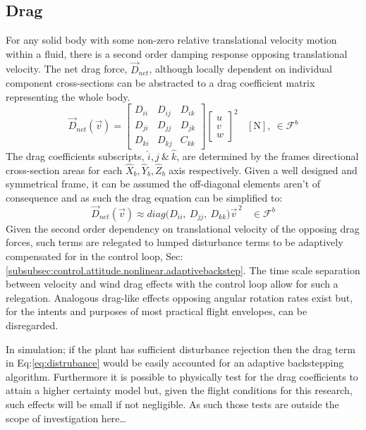 \subsection{Drag}
\label{subsec:dynamics.aero.drag}
For any solid body with some non-zero relative translational velocity motion within a fluid, there is a second order damping response opposing translational velocity. The net drag force, $\vec{D}_{net}$, although locally dependent on individual component cross-sections can be abstracted to a drag coefficient matrix representing the whole body.
\begin{equation}\label{eq:distrubance}
\vec{D}_{net}(\vec{v})=\begin{bmatrix}
D_{ii} & D_{ij} & D_{ik}\\
D_{ji} & D_{jj} & D_{jk}\\
D_{ki} & D_{kj} & C_{kk}
\end{bmatrix}
\begin{bmatrix}
u\\
v\\
w
\end{bmatrix}^2
~~~~[\text{N}],~\in\mathcal{F}^b
\end{equation}
The drag coefficients subscripts, $\hat{i},\hat{j}~\&~\hat{k}$, are determined by the frames directional cross-section areas for each $\hat{X}_b,\hat{Y}_b,\hat{Z}_b$ axis respectively. Given a well designed and symmetrical frame, it can be assumed the off-diagonal elements aren't of consequence and as such the drag equation can be simplified to:
\begin{equation}
\vec{D}_{net}(\vec{v})\approx diag\big(D_{ii},~D_{jj},~D_{kk}\big)\vec{v}^{\hspace{2pt}2}~~~~\in\mathcal{F}^b
\end{equation}
Given the second order dependency on translational velocity of the opposing drag forces, such terms are relegated to lumped disturbance terms to be adaptively compensated for in the control loop, Sec:\ref{subsubsec:control.attitude.nonlinear.adaptivebackstep}. The time scale separation between velocity and wind drag effects with the control loop allow for such a relegation. Analogous drag-like effects opposing angular rotation rates exist but, for the intents and purposes of most practical flight envelopes, can be disregarded.
\par
In simulation; if the plant has sufficient disturbance rejection then the drag term in Eq:\ref{eq:distrubance} would be easily accounted for an adaptive backstepping algorithm. Furthermore it is possible to physically test for the drag coefficients to attain a higher certainty model but, given the flight conditions for this research, such effects will be small if not negligible. As such those tests are outside the scope of investigation here\ldots
